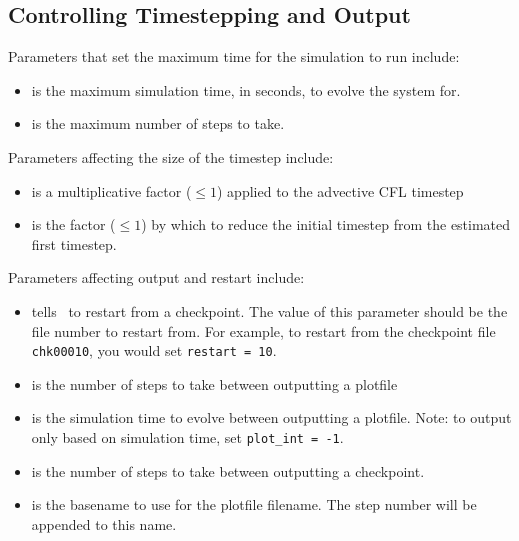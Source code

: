 \subsection{Controlling Timestepping and Output}

Parameters that set the maximum time for the simulation to run
include:
\begin{itemize}
\item {} is the maximum simulation time, in seconds,
      to evolve the system for.

\item {} is the maximum number of steps to take.
\end{itemize}

\noindent Parameters affecting the size of the timestep include:
\begin{itemize}
\item {} is a multiplicative factor ({\tt $\le 1$}) 
      applied to the advective CFL timestep

\item {} is the factor ({\tt $\le 1$}) by which to reduce 
      the initial timestep from the estimated first timestep.
\end{itemize}

\noindent Parameters affecting output and restart include:
\begin{itemize}

\item {} tells \maestroex\ to restart from a checkpoint.  The
      value of this parameter should be the file number to restart from.
      For example, to restart from the checkpoint file {\tt chk00010},
      you would set {\tt restart = 10}.

\item {} is the number of steps to take between
  outputting a plotfile

\item {} is the simulation time to evolve between
  outputting a plotfile.  Note: to output only based on simulation
  time, set {\tt plot\_int = -1}.

\item {} is the number of steps to take between
  outputting a checkpoint.

\item {} is the basename to use for the
  plotfile filename.  The step number will be appended to
  this name.

\end{itemize}

